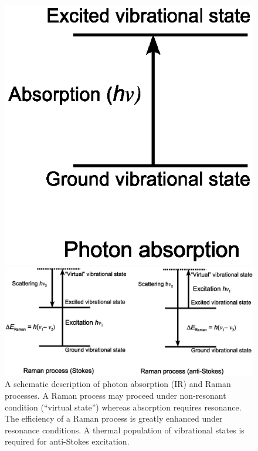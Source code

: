 \documentclass[byrevtex,amssymb,aps,pra,floatfix,letterpaper]{revtex4}
\begin{document}
\begin{figure}[!htp]
\begin{center}
\includegraphics[scale=0.5]{fig1a}
\end{center}
\vspace{-1cm}
\begin{center}
\includegraphics[scale=0.5]{fig1b}
\caption{A schematic description of photon absorption (IR) and Raman processes. A Raman process may proceed under non-resonant condition (``virtual state'') whereas absorption requires resonance. The efficiency of a Raman process is greatly enhanced under resonance conditions. A thermal population of vibrational states is required for anti-Stokes excitation.}
\label{fig1}
\end{center}
\end{figure}
\end{document}
